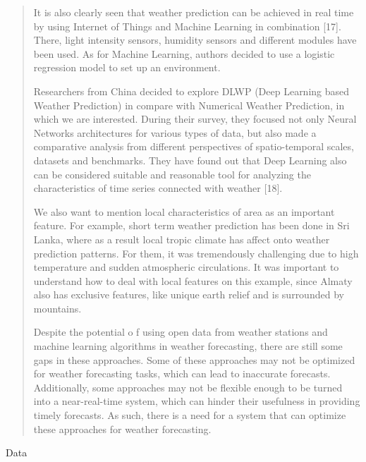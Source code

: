 \begin{quote}
It is also clearly seen that weather prediction can be achieved in real
time by using Internet of Things and Machine Learning in combination
{[}17{]}. There, light intensity sensors, humidity sensors and different
modules have been used. As for Machine Learning, authors decided to use
a logistic regression model to set up an environment.

Researchers from China decided to explore DLWP (Deep Learning based
Weather Prediction) in compare with Numerical Weather Prediction, in
which we are interested. During their survey, they focused not only
Neural Networks architectures for various types of data, but also made a
comparative analysis from different perspectives of spatio-temporal
scales, datasets and benchmarks. They have found out that Deep Learning
also can be considered suitable and reasonable tool for analyzing the
characteristics of time series connected with weather {[}18{]}.

We also want to mention local characteristics of area as an important
feature. For example, short term weather prediction has been done in Sri
Lanka, where as a result local tropic climate has affect onto weather
prediction patterns. For them, it was tremendously challenging due to
high temperature and sudden atmospheric circulations. It was important
to understand how to deal with local features on this example, since
Almaty also has exclusive features, like unique earth relief and is
surrounded by mountains.

Despite the potential o f using open data from weather stations and
machine learning algorithms in weather forecasting, there are still some
gaps in these approaches. Some of these approaches may not be optimized
for weather forecasting tasks, which can lead to inaccurate forecasts.
Additionally, some approaches may not be flexible enough to be turned
into a near-real-time system, which can hinder their usefulness in
providing timely forecasts. As such, there is a need for a system that
can optimize these approaches for weather forecasting.
\end{quote}

Data

